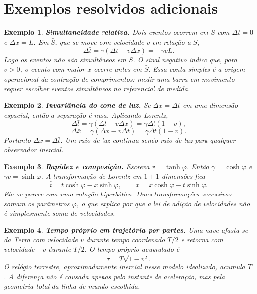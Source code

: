 \documentclass[12pt,a4paper,oneside]{book}
\theoremstyle{rgplain}
\newtheorem{example}{Exemplo}[chapter]
\theoremstyle{rgremark}
\begin{document}
\section{Exemplos resolvidos adicionais}

\begin{example}
\textbf{Simultaneidade relativa.} Dois eventos ocorrem em $S$ com
$\Delta t=0$ e $\Delta x=L$. Em $\bar S$, que se move com velocidade $v$ em relação
a $S$,
\[
  \Delta \bar t=\gamma(\Delta t-v\Delta x)=-\gamma vL.
\]
Logo os eventos não são simultâneos em $\bar S$. O sinal negativo indica que, para
$v>0$, o evento com maior $x$ ocorre antes em $\bar S$. Essa conta simples é a
origem operacional da contração de comprimentos: medir uma barra em movimento
requer escolher eventos simultâneos no referencial de medida.
\end{example}

\begin{example}
\textbf{Invariância do cone de luz.} Se $\Delta x=\Delta t$ em uma dimensão
espacial, então a separação é nula. Aplicando Lorentz,
\[
  \Delta \bar t=\gamma(\Delta t-v\Delta x)=\gamma\Delta t(1-v),
\]
\[
  \Delta \bar x=\gamma(\Delta x-v\Delta t)=\gamma\Delta t(1-v).
\]
Portanto $\Delta \bar x=\Delta \bar t$. Um raio de luz continua sendo raio de luz para
qualquer observador inercial.
\end{example}

\begin{example}
\label{ex:rapidez}
\textbf{Rapidez e composição.} Escreva $v=\tanh\varphi$. Então
$\gamma=\cosh\varphi$ e $\gamma v=\sinh\varphi$. A transformação de Lorentz em
$1+1$ dimensões fica
\[
  \bar t = t\cosh\varphi-x\sinh\varphi,\qquad
  \bar x = x\cosh\varphi-t\sinh\varphi.
\]
Ela se parece com uma rotação hiperbólica. Duas transformações sucessivas
somam os parâmetros $\varphi$, o que explica por que a lei de adição de
velocidades não é simplesmente soma de velocidades.
\end{example}

\begin{example}
\textbf{Tempo próprio em trajetória por partes.} Uma nave afasta-se da Terra
com velocidade $v$ durante tempo coordenado $T/2$ e retorna com velocidade
$-v$ durante $T/2$. O tempo próprio acumulado é
\[
  \tau=T\sqrt{1-v^2}.
\]
O relógio terrestre, aproximadamente inercial nesse modelo idealizado, acumula
$T$. A diferença não é causada apenas pelo instante de aceleração, mas pela
geometria total da linha de mundo escolhida.
\end{example}
\end{document}
